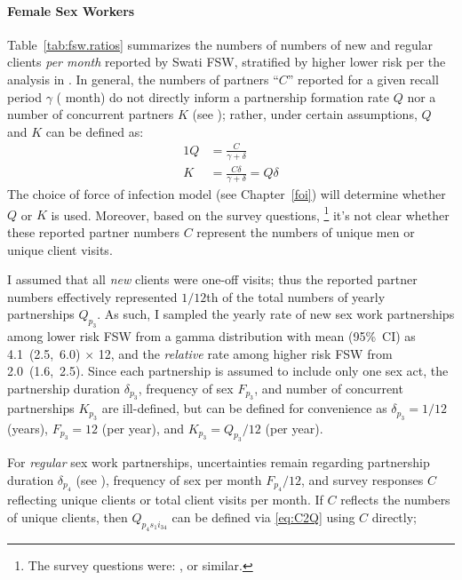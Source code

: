 \paragraph{Female Sex Workers}
Table~\ref{tab:fsw.ratios} summarizes the numbers of
numbers of new and regular clients \emph{per month} reported by Swati FSW,
stratified by higher \vs lower risk per the analysis in .
In general, the numbers of partners ``$C$'' reported
for a given recall period $\gamma$ ( month)
do not directly inform a partnership formation rate $Q$ nor a number of concurrent partners $K$
(see );
rather, under certain assumptions, $Q$ and $K$ can be defined as:
\begin{alignat}{1}
  Q &= \frac{C}{\gamma+\delta} \label{eq:C2Q}\\
  K &= \frac{C\delta}{\gamma+\delta} = Q\delta \label{eq:C2K}
\end{alignat}
The choice of force of infection model (see Chapter~\ref{foi})
will determine whether $Q$ or $K$ is used.
Moreover, based on the survey questions,%
\footnote{The survey questions were: , or similar.}
it's not clear whether these reported partner numbers $C$
represent the numbers of unique men or unique client visits.
\par
I assumed that all \emph{new} clients were one-off visits;
thus the reported partner numbers effectively represented
$1/12$th of the total numbers of yearly partnerships $Q_{p_{3}}$.
As such, I sampled the yearly rate of new sex work partnerships among lower risk FSW
from a gamma distribution with mean (95\%~CI) as 4.1~(2.5,~6.0) $\times$ 12,
and the \emph{relative} rate among higher risk FSW from 2.0~(1.6,~2.5).
Since each partnership is assumed to include only one sex act,
the partnership duration $\delta_{p_{3}}$, frequency of sex $F_{p_{3}}$,
and number of concurrent partnerships $K_{p_{3}}$ are ill-defined,
but can be defined for convenience as
$\delta_{p_{3}} = 1/12$ (years), $F_{p_{3}} = 12$ (per year),
and $K_{p_{3}} = Q_{p_{3}} / 12$ (per year).
\par
For \emph{regular} sex work partnerships, uncertainties remain regarding
partnership duration $\delta_{p_{4}}$ (see ),
frequency of sex per month $F_{p_{4}}/12$, and
survey responses $C$ reflecting unique clients or total client visits per month.
If $C$ reflects the numbers of unique clients, then
$Q_{p_{4}s_{1}i_{34}}$ can be defined via \eqref{eq:C2Q} using $C$ directly;
